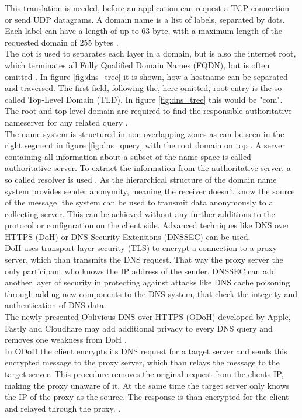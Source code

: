         This translation is needed, before an application can request a TCP connection or send UDP datagrams. A domain name is a list of labels, separated by dots. 
        Each label can have a length of up to 63 byte, with a maximum length of the requested domain of 255 bytes \cite{stevens_tcpip_1993}.\\
        The dot is used to separates each layer in a domain, but is also the internet root, which terminates all Fully Qualified Domain Names (FQDN), but is often omitted \cite{jeftovic_managing_2018}.
        In figure \ref{fig:dns_tree} it is shown, how a hostname can be separated and traversed.
        The first field, following the, here omitted, root entry is the so called Top-Level Domain (TLD). In figure \ref{fig:dns_tree} this would be "com". The root and top-level domain are required to find the responsible authoritative nameserver for any related query \cite{jeftovic_managing_2018}.\\

        The name system is structured in non overlapping zones as can be seen in the right segment in figure \ref{fig:dns_query} with the root domain on top \cite{herrmann_beobachtungsmoglichkeiten_2016}.
        A server containing all information about a subset of the name space is called authoritative server. To extract the information from the authoritative server, a so called resolver is used \cite{friedewald_privacy_2018}.
        As the hierarchical structure of the domain name system provides sender anonymity, meaning the receiver doesn't know the source of the message, the system can be used to transmit data anonymously to a collecting server. This can be achieved without any further additions to the protocol or configuration on the client side.
        Advanced techniques like DNS over HTTPS (DoH) \cite{ermert_cloudflare_2020} \cite{mcmanus_dns_2018} or DNS Security Extensions (DNSSEC) \cite{larson_dns_2005} can be used.\\
        DoH uses transport layer security (TLS) to encrypt a connection to a proxy server, which than transmits the DNS request. That way the proxy server the only participant who knows the IP address of the sender. DNSSEC can add another layer of security in protecting against attacks like DNS cache poisoning through adding new components to the DNS system, that check the integrity and authentication of DNS data.\\
        The newly presented Oblivious DNS over HTTPS (ODoH) developed by Apple, Fastly and Cloudflare may add additional privacy to every DNS query and removes one weakness from DoH \cite{verma_improving_2020}.\\
        In ODoH the client encrypts its DNS request for a target server and sends this encrypted message to the proxy server, which than relays the message to the target server. This procedure removes the original request from the clients IP, making the proxy unaware of it.
    At the same time the target server only knows the IP of the proxy as the source. The response is than encrypted for the client and relayed through the proxy. \cite{verma_improving_2020}.
        
